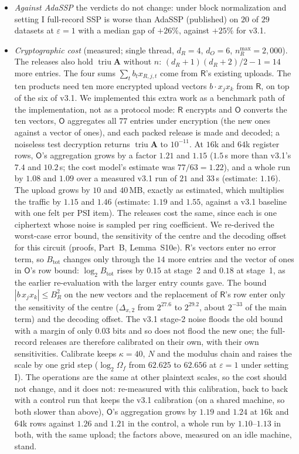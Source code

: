 \documentclass[11pt]{article}
\theoremstyle{definition}
\theoremstyle{plain}
\newcommand{\bA}{\mathbf{A}}
\newcommand{\Party}[1]{\textsf{#1}}
\newcommand{\Rp}{\Party{R}}
\newcommand{\Op}{\Party{O}}
\DeclareMathOperator{\triu}{triu}
\begin{document}
\begin{itemize}
  \item \emph{Against AdaSSP} the verdicts do not change: under block normalization and setting I full-record SSP is worse than AdaSSP (published) on $20$ of $29$ datasets at $\varepsilon = 1$ with a median gap of $+26\%$, against $+25\%$ for v3.1.
  \item \emph{Cryptographic cost} (measured; single thread, $d_R = 4$, $d_O = 6$, $n_R^{\max} = 2{,}000$). The releases also hold $\triu\bA$ without $n$: $(d_R + 1)(d_R + 2)/2 - 1 = 14$ more entries. The four sums $\sum_t b_t x_{R,j,t}$ come from $\Rp$'s existing uploads. The ten products need ten more encrypted upload vectors $b \cdot x_j x_k$ from $\Rp$, on top of the six of v3.1. We implemented this extra work as a benchmark path of the implementation, not as a protocol mode: $\Rp$ encrypts and $\Op$ converts the ten vectors, $\Op$ aggregates all $77$ entries under encryption (the new ones against a vector of ones), and each packed release is made and decoded; a noiseless test decryption returns $\triu\bA$ to $10^{-11}$. At $16$k and $64$k register rows, $\Op$'s aggregation grows by a factor $1.21$ and $1.15$ ($1.5$\,s more than v3.1's $7.4$ and $10.2$\,s; the cost model's estimate was $77/63 = 1.22$), and a whole run by $1.08$ and $1.09$ over a measured v3.1 run of $21$ and $33$\,s (estimate: $1.16$). The upload grows by $10$ and $40$\,MB, exactly as estimated, which multiplies the traffic by $1.15$ and $1.46$ (estimate: $1.19$ and $1.55$, against a v3.1 baseline with one felt per PSI item). The releases cost the same, since each is one ciphertext whose noise is sampled per ring coefficient. We re-derived the worst-case error bound, the sensitivity of the centre and the decoding offset for this circuit (proofs, Part~B, Lemma~S10e). $\Rp$'s vectors enter no error term, so $B_{\mathrm{tot}}$ changes only through the $14$ more entries and the vector of ones in $\Op$'s row bound: $\log_2 B_{\mathrm{tot}}$ rises by $0.15$ at stage~2 and $0.18$ at stage~1, as the earlier re-evaluation with the larger entry counts gave. The bound $|b\,x_jx_k| \le B_R^2$ on the new vectors and the replacement of $\Rp$'s row enter only the sensitivity of the centre ($\Delta_{x,2}$ from $2^{27.6}$ to $2^{29.2}$, about $2^{-33}$ of the main term) and the decoding offset. The v3.1 stage-2 noise floods the old bound with a margin of only $0.03$ bits and so does not flood the new one; the full-record releases are therefore calibrated on their own, with their own sensitivities. Calibrate keeps $\kappa = 40$, $N$ and the modulus chain and raises the scale by one grid step ($\log_2\Omega_f$ from $62.625$ to $62.656$ at $\varepsilon = 1$ under setting I). The operations are the same at other plaintext scales, so the cost should not change, and it does not: re-measured with this calibration, back to back with a control run that keeps the v3.1 calibration (on a shared machine, so both slower than above), $\Op$'s aggregation grows by $1.19$ and $1.24$ at $16$k and $64$k rows against $1.26$ and $1.21$ in the control, a whole run by $1.10$--$1.13$ in both, with the same upload; the factors above, measured on an idle machine, stand.
\end{itemize}
\end{document}
